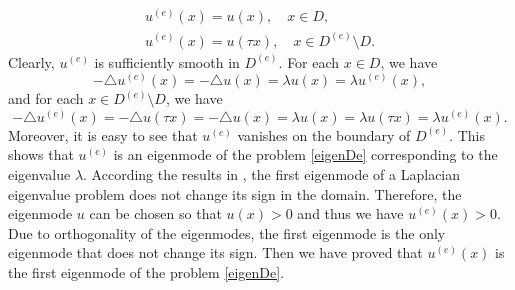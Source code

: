 \documentclass[a4paper,11pt]{article}
\begin{document}
\begin{appendices}
\begin{gather*}
u^{(e)}(x) = u(x), \quad x \in D,\\
u^{(e)}(x) = u(\tau x), \quad x \in D^{(e)} \setminus D.
\end{gather*}
Clearly, $u^{(e)}$ is sufficiently smooth in $D^{(e)}$. For each $x \in D$, we have
\begin{equation*}
-\triangle u^{(e)}(x) = -\triangle u(x) = \lambda u(x) = \lambda u^{(e)}(x),
\end{equation*}
and for each $x \in D^{(e)} \setminus D$, we have
\begin{equation*}
-\triangle u^{(e)}(x) = -\triangle u(\tau x) = -\triangle u(x) = \lambda u(x) = \lambda u(\tau x) = \lambda u^{(e)}(x).
\end{equation*}
Moreover, it is easy to see that $u^{(e)}$ vanishes on the boundary of $D^{(e)}$. This shows that $u^{(e)}$ is an eigenmode of the problem \eqref{eigenDe} corresponding to the eigenvalue $\lambda$. According the results in \cite{2012Geometrical}, the first eigenmode of a Laplacian eigenvalue problem does not change its sign in the domain. Therefore, the eigenmode $u$ can be chosen so that $u(x) > 0$ and thus we have $u^{(e)}(x) > 0$. Due to orthogonality of the eigenmodes, the first eigenmode is the only eigenmode that does not change its sign. Then we have proved that $u^{(e)}(x)$ is the first eigenmode of the problem \eqref{eigenDe}.



\end{appendices}
\end{document}
